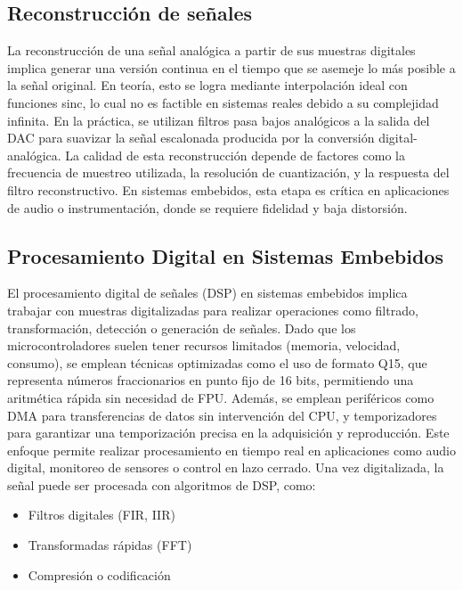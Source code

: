 \documentclass[12pt]{article}
\begin{document}
	\subsection{Reconstrucción de señales}
	La reconstrucción de una señal analógica a partir de sus muestras digitales implica generar una versión continua en el tiempo que se asemeje lo más posible a la señal original. En teoría, esto se logra mediante interpolación ideal con funciones sinc, lo cual no es factible en sistemas reales debido a su complejidad infinita. En la práctica, se utilizan filtros pasa bajos analógicos a la salida del DAC para suavizar la señal escalonada producida por la conversión digital-analógica. La calidad de esta reconstrucción depende de factores como la frecuencia de muestreo utilizada, la resolución de cuantización, y la respuesta del filtro reconstructivo. En sistemas embebidos, esta etapa es crítica en aplicaciones de audio o instrumentación, donde se requiere fidelidad y baja distorsión.
	
	\subsection{Procesamiento Digital en Sistemas Embebidos}
	El procesamiento digital de señales (DSP) en sistemas embebidos implica trabajar con muestras digitalizadas para realizar operaciones como filtrado, transformación, detección o generación de señales. Dado que los microcontroladores suelen tener recursos limitados (memoria, velocidad, consumo), se emplean técnicas optimizadas como el uso de formato Q15, que representa números fraccionarios en punto fijo de 16 bits, permitiendo una aritmética rápida sin necesidad de FPU. Además, se emplean periféricos como DMA para transferencias de datos sin intervención del CPU, y temporizadores para garantizar una temporización precisa en la adquisición y reproducción. Este enfoque permite realizar procesamiento en tiempo real en aplicaciones como audio digital, monitoreo de sensores o control en lazo cerrado.
	Una vez digitalizada, la señal puede ser procesada con algoritmos de DSP, como:
	
	\begin{itemize}
		\item Filtros digitales (FIR, IIR)
		
		\item Transformadas rápidas (FFT)
		
		\item Compresión o codificación
	\end{itemize}\newpage
	
\end{document}
